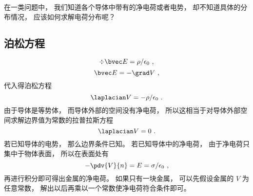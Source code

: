 
\begin{issues}
\issueDraft
\end{issues}

在一类问题中， 我们知道各个导体中带有的净电荷或者电势， 却不知道具体的分布情况， 应该如何求解电荷分布呢？

\subsection{泊松方程}
\begin{equation}
\div \bvec E = \rho/\epsilon_0~,
\end{equation}
\begin{equation}
\bvec E = -\grad V~,
\end{equation}
代入得泊松方程
\begin{equation}
\laplacian V = -\rho/\epsilon_0~.
\end{equation}
由于导体是等势体， 而导体外部的空间没有净电荷， 所以这相当于对导体外部空间求解边界值为常数的拉普拉斯方程
\begin{equation}
\laplacian V = 0~.
\end{equation}
若已知导体的电势， 那么边界条件已知。 若已知导体中的净电荷， 由于净电荷只集中于物体表面， 所以在表面处有
\begin{equation}
-\pdv{V}{n} = E = \sigma/\epsilon_0~,
\end{equation}
再进行积分即可得出金属的净电荷。 如果只有一块金属， 可以先假设金属的 $V$ 为任意常数， 解出以后再乘以一个常数使净电荷符合条件即可。


